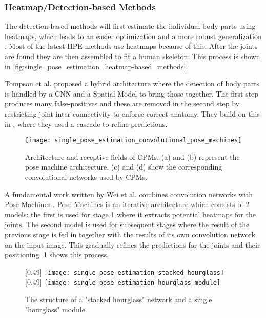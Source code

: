 \subsubsection{Heatmap/Detection-based Methods}
The detection-based methods will first estimate the individual body parts using heatmaps, which leads to an easier optimization and a more robust generalization \cite{chen2022}.
Most of the latest \gls{HPE} methods use heatmaps because of this.
After the joints are found they are then assembled to fit a human skeleton.
This process is shown in \ref{fig:single_pose_estimation_heatmap-based_methods}.

Tompson et al. \cite{TompsonJLB14} proposed a hybrid architecture where the detection of body parts is handled by a \gls{CNN} and a Spatial-Model to bring those together.
The first step produces many false-positives and these are removed in the second step by restricting joint inter-connectivity to enforce correct anatomy.
They build on this in \cite{Tompson2015}, where they used a cascade to refine predictions.

\begin{figure}
	\centering
	\texttt{[image: single\_pose\_estimation\_convolutional\_pose\_machines]}%
	\caption{
		Architecture and receptive fields of \gls{CPMs}. (a) and (b) represent the pose machine architecture.\cite{Ramakrishna2014}
		(c) and (d) show the corresponding convolutional networks used by \gls{CPMs}.\cite{Wei2016}
	}
	\label{fig:convolutional_pose_machines}
\end{figure}

A fundamental work written by Wei et al. \cite{Wei2016} combines convolution networks with Pose Machines \cite{Ramakrishna2014}.
Pose Machines is an iterative architecture which consists of 2 models: the first is used for stage 1 where it extracts potential heatmaps for the joints.
The second model is used for subsequent stages where the result of the previous stage is fed in together with the results of its own convolution network on the input image. 
This gradually refines the predictions for the joints and their positioning.
\ref{fig:convolutional_pose_machines} shows this process.

\begin{figure}
	\centering
	[0.49\textwidth]{%
		\texttt{[image: single\_pose\_estimation\_stacked\_hourglass]}%
	}
	[0.49\textwidth]{%
		\texttt{[image: single\_pose\_estimation\_hourglass\_module]}%
	}
	\caption{
		The structure of a "stacked hourglass" network and a single "hourglass" module.\cite{Newell2016}
	}
	\label{fig:stacked_hourglass}
\end{figure}

